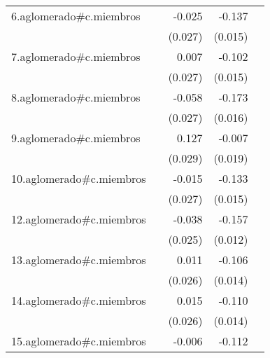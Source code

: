 {\begin{longtable}{l*{4}{D{.}{.}{-1}}}
\addlinespace
6.aglomerado#c.miembros&                     &      -0.025         &      -0.137\sym{***}&                     \\
            &                     &     (0.027)         &     (0.015)         &                     \\
\addlinespace
7.aglomerado#c.miembros&                     &       0.007         &      -0.102\sym{***}&                     \\
            &                     &     (0.027)         &     (0.015)         &                     \\
\addlinespace
8.aglomerado#c.miembros&                     &      -0.058\sym{*}  &      -0.173\sym{***}&                     \\
            &                     &     (0.027)         &     (0.016)         &                     \\
\addlinespace
9.aglomerado#c.miembros&                     &       0.127\sym{***}&      -0.007         &                     \\
            &                     &     (0.029)         &     (0.019)         &                     \\
\addlinespace
10.aglomerado#c.miembros&                     &      -0.015         &      -0.133\sym{***}&                     \\
            &                     &     (0.027)         &     (0.015)         &                     \\
\addlinespace
12.aglomerado#c.miembros&                     &      -0.038         &      -0.157\sym{***}&                     \\
            &                     &     (0.025)         &     (0.012)         &                     \\
\addlinespace
13.aglomerado#c.miembros&                     &       0.011         &      -0.106\sym{***}&                     \\
            &                     &     (0.026)         &     (0.014)         &                     \\
\addlinespace
14.aglomerado#c.miembros&                     &       0.015         &      -0.110\sym{***}&                     \\
            &                     &     (0.026)         &     (0.014)         &                     \\
\addlinespace
15.aglomerado#c.miembros&                     &      -0.006         &      -0.112\sym{***}&                     \\

\end{longtable}}
